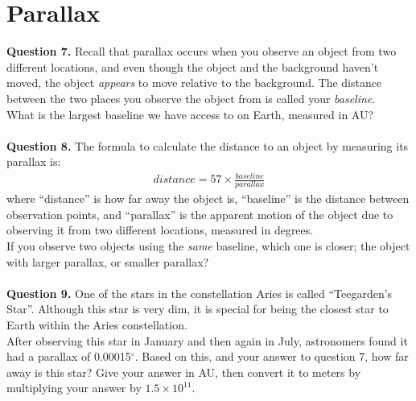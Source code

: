 \documentclass[11pt]{article}
\begin{document}
\newpage

\section{Parallax}

\textbf{Question 7.} Recall that parallax occurs when you observe an object from two different locations, and even though the object and the background haven't moved, the object \textit{appears} to move relative to the background. The distance between the two places you observe the object from is called your \textit{baseline}.\\

What is the largest baseline we have access to on Earth, measured in AU?\\

\vspace{1.5cm}
\hrulefill\\

\textbf{Question 8.} The formula to calculate the distance to an object by measuring its parallax is:
\begin{align*}
distance=57\times \frac{baseline}{parallax}
\end{align*}
where ``distance'' is how far away the object is, ``baseline'' is the distance between observation points, and ``parallax'' is the apparent motion of the object due to observing it from two different locations, measured in degrees.\\

If you observe two objects using the \textit{same} baseline, which one is closer; the object with larger parallax, or smaller parallax? \\

\vspace{1.5cm}
\hrulefill\\

\textbf{Question 9.} One of the stars in the constellation Aries is called ``Teegarden's Star''. Although this star is very dim, it is special for being the closest star to Earth within the Aries constellation.\\ 

After observing this star in January and then again in July, astronomers found it had a parallax of 0.00015$^\circ$. Based on this, and your answer to question 7, how far away is this star? Give your answer in AU, then convert it to meters by multiplying your answer by $1.5\times 10^{11}$.\\

\vspace{1.5cm}
\hrulefill\\
\end{document}
